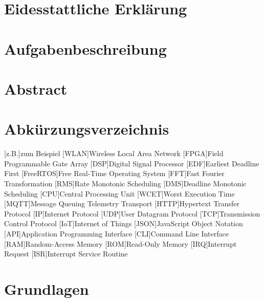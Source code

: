\documentclass{scrartcl}
\begin{document}
\begin{titlepage}
		
	\end{titlepage}
	\clearpage 
	\section*{Eidesstattliche Erklärung}
		
		\clearpage
	\section*{Aufgabenbeschreibung}
		
		\clearpage
	\section*{Abstract}
		
		\clearpage
	\tableofcontents
		\clearpage
	\section*{Abkürzungsverzeichnis}
	\begin{acronym}[abkuerzungen]
		{zum Beispiel}
		{Wireless Local Area Network}
		{Field Programmable Gate Array}
		[DSP]{Digital Signal Processor}
		[EDF]{Earliest Deadline First}
		[FreeRTOS]{Free Real-Time Operating System}
		[FFT]{Fast Fourier Transformation}
		[RMS]{Rate Monotonic Scheduling}
		[DMS]{Deadline Monotonic Scheduling}
		[CPU]{Central Processing Unit}
		{Worst Execution Time}
		{Message Queuing Telemetry Transport}
		{Hypertext Transfer Protocol}
		[IP]{Internet Protocol}
		[UDP]{User Datagram Protocol}
		[TCP]{Transmission Control Protocol}
		[IoT]{Internet of Things}
		{JavaScript Object Notation}
		[API]{Application Programming Interface}
		[CLI]{Command Line Interface}
		[RAM]{Random-Access Memory}
		[ROM]{Read-Only Memory}
		[IRQ]{Interrupt Request}
		[ISR]{Interrupt Service Routine}
	\end{acronym}
	\clearpage
	\clearpage
	\section{Grundlagen}
		
\end{document}
